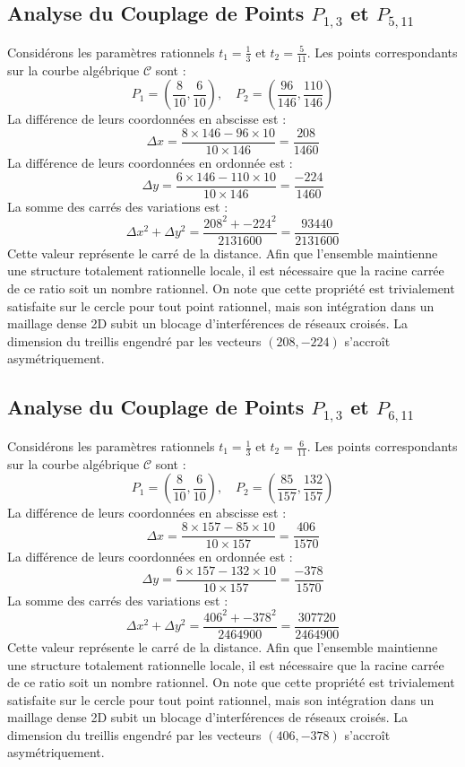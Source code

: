 \documentclass[12pt, a4paper]{article}
\begin{document}
\subsection{Analyse du Couplage de Points $P_{1,3}$ et $P_{5,11}$}
Considérons les paramètres rationnels $t_1 = \frac{1}{3}$ et $t_2 = \frac{5}{11}$.
Les points correspondants sur la courbe algébrique $\mathcal{C}$ sont :
$$ P_1 = \left( \frac{8}{10}, \frac{6}{10} \right), \quad P_2 = \left( \frac{96}{146}, \frac{110}{146} \right) $$
La différence de leurs coordonnées en abscisse est :
$$ \Delta x = \frac{8 \times 146 - 96 \times 10}{10 \times 146} = \frac{208}{1460} $$
La différence de leurs coordonnées en ordonnée est :
$$ \Delta y = \frac{6 \times 146 - 110 \times 10}{10 \times 146} = \frac{-224}{1460} $$
La somme des carrés des variations est :
$$ \Delta x^2 + \Delta y^2 = \frac{ 208^2 + -224^2 }{ 2131600 } = \frac{ 93440 }{ 2131600 } $$
Cette valeur représente le carré de la distance. Afin que l'ensemble maintienne une structure totalement rationnelle locale, il est nécessaire que la racine carrée de ce ratio soit un nombre rationnel. On note que cette propriété est trivialement satisfaite sur le cercle pour tout point rationnel, mais son intégration dans un maillage dense 2D subit un blocage d'interférences de réseaux croisés. La dimension du treillis engendré par les vecteurs $( 208, -224 )$ s'accroît asymétriquement.


\subsection{Analyse du Couplage de Points $P_{1,3}$ et $P_{6,11}$}
Considérons les paramètres rationnels $t_1 = \frac{1}{3}$ et $t_2 = \frac{6}{11}$.
Les points correspondants sur la courbe algébrique $\mathcal{C}$ sont :
$$ P_1 = \left( \frac{8}{10}, \frac{6}{10} \right), \quad P_2 = \left( \frac{85}{157}, \frac{132}{157} \right) $$
La différence de leurs coordonnées en abscisse est :
$$ \Delta x = \frac{8 \times 157 - 85 \times 10}{10 \times 157} = \frac{406}{1570} $$
La différence de leurs coordonnées en ordonnée est :
$$ \Delta y = \frac{6 \times 157 - 132 \times 10}{10 \times 157} = \frac{-378}{1570} $$
La somme des carrés des variations est :
$$ \Delta x^2 + \Delta y^2 = \frac{ 406^2 + -378^2 }{ 2464900 } = \frac{ 307720 }{ 2464900 } $$
Cette valeur représente le carré de la distance. Afin que l'ensemble maintienne une structure totalement rationnelle locale, il est nécessaire que la racine carrée de ce ratio soit un nombre rationnel. On note que cette propriété est trivialement satisfaite sur le cercle pour tout point rationnel, mais son intégration dans un maillage dense 2D subit un blocage d'interférences de réseaux croisés. La dimension du treillis engendré par les vecteurs $( 406, -378 )$ s'accroît asymétriquement.
\end{document}
